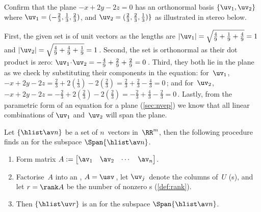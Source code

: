 \begin{example} \label{eg:orthbas2}
Confirm that the plane \(-x+2y-2z=0\) has an orthonormal basis \(\{\uv_1,\uv_2\}\) where \(\uv_1=(-\frac23,\frac13,\frac23)\), and \(\uv_2=(\frac23,\frac23,\frac13)\}\) as illustrated in stereo below.
\begin{center}
 {}
\end{center}
\begin{solution} 
First, the given set is of unit vectors as the lengths are \(|\uv_1|=\sqrt{\frac49+\frac19+\frac49}=1\) and \(|\uv_2|=\sqrt{\frac49+\frac49+\frac19}=1\)\,.
Second, the set is orthonormal as their dot product is zero: \(\uv_1\cdot\uv_2=-\frac49+\frac29+\frac29=0\)\,.
Third, they both lie in the plane as we check by substituting their components in the equation: for~\(\uv_1\), \(-x+2y-2z=\frac23+2(\frac13)-2(\frac23)=\frac23+\frac23-\frac43=0\)\,; and for~\(\uv_2\), \(-x+2y-2z=-\frac23+2(\frac23)-2(\frac23)=-\frac23+\frac43-\frac23=0\)\,.
Lastly, from the parametric form of an equation for a plane (\autoref{sec:nvep}) we know that all linear combinations of \(\uv_1\) and~\(\uv_2\) will span the plane.
\end{solution}
\end{example}





\begin{procedure}\label{pro:ospan}
	Let $\{\hlist\av n\}$ be a set of $n$~vectors in~\(\RR^m\), then the following procedure finds an  for the subspace \(\Span\{\hlist\av n\}\). 
\begin{enumerate}
\item Form matrix $A:= \begin{bmatrix} \av_1 & \av_2& \cdots&\av_n \end{bmatrix}$. 
\item Factorise~\(A\) into an \svd, $A=\usv$\,, let \(\uv_j\)~denote the columns of~$U$ (s), and let \(r=\rank A\) be the number of nonzero s (\autoref{def:rank}).  
\item Then \(\{\hlist\uv r\}\) is an  for the subspace \(\Span\{\hlist\av n\}\).
\end{enumerate}
\end{procedure}

